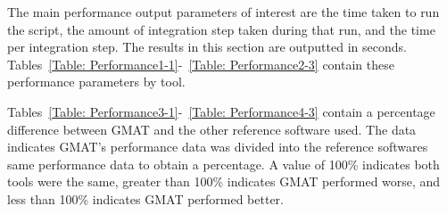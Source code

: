The main performance output parameters of interest are the time
taken to run the script, the amount of integration step taken during
that run, and the time per integration step. The results in this
section are outputted in seconds. Tables~\ref{Table:
Performance1-1}-~\ref{Table: Performance2-3} contain these
performance parameters by tool.

Tables~\ref{Table: Performance3-1}-~\ref{Table: Performance4-3}
contain a percentage difference between GMAT and the other reference
software used. The data indicates GMAT's performance data was
divided into the reference softwares same performance data to obtain
a percentage. A value of 100\% indicates both tools were the same,
greater than 100\% indicates GMAT performed worse, and less than
100\% indicates GMAT performed better.













